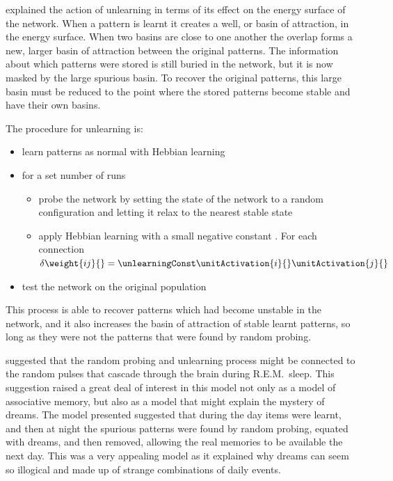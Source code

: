 \citet{Hopfield83} explained the action of unlearning in terms of its effect on the energy surface of the network.  When a pattern is learnt it creates a well, or basin of attraction, in the energy surface.  When two basins are close to one another the overlap forms a new, larger basin of attraction between the original patterns.  The information about which patterns were stored is still buried in the network, but it is now masked by the large spurious basin.  To recover the original patterns, this large basin must be reduced to the point where the stored patterns become stable and have their own basins.

The procedure for unlearning is:
\begin{itemize}[topsep=1ex, leftmargin=1cm, labelsep=0.2cm, itemindent=0pt,label=\textbullet]
	\item learn patterns as normal with Hebbian learning
	\item for a set number of runs
	\begin{itemize}[topsep=1ex, leftmargin=1cm, labelsep=0.2cm, itemindent=0pt,label=\textbullet]
		\item probe the network by setting the state of the network to a random configuration and letting it relax to the nearest stable state
		\item apply Hebbian learning with a small negative constant \unlearningConst.  For each connection $\delta \weight{ij}{} = \unlearningConst \unitActivation{i}{} \unitActivation{j}{}$
	\end{itemize}
	\item test the network on the original population
\end{itemize}
This process is able to recover patterns which had become unstable in the network, and it also increases the basin of attraction of stable learnt patterns, so long as they were not the patterns that were found by random probing.

\citet{Crick1983} suggested that the random probing and unlearning process might be connected to the random pulses that cascade through the brain during R.E.M.\ sleep.  This suggestion raised a great deal of interest in this model not only as a model of associative memory, but also as a model that might explain the mystery of dreams.  The model presented suggested that during the day items were learnt, and then at night the spurious patterns were found by random probing, equated with dreams, and then removed, allowing the real memories to be available the next day.  This was a very appealing model as it explained why dreams can seem so illogical and made up of strange combinations of daily events.

